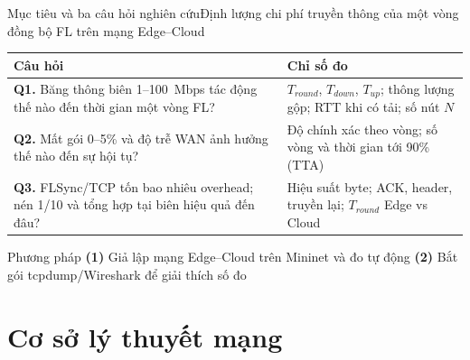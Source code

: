 \documentclass[aspectratio=169,10pt]{beamer}
\begin{document}
\begin{frame}{Mục tiêu và ba câu hỏi nghiên cứu}{Định lượng chi phí truyền thông của một vòng đồng bộ FL trên mạng Edge--Cloud}
  \small
  \begin{tabularx}{\textwidth}{>{\raggedright\arraybackslash\hsize=1.1\hsize}X >{\raggedright\arraybackslash\hsize=0.9\hsize}X}
    \toprule
    \textbf{Câu hỏi} & \textbf{Chỉ số đo} \\
    \midrule
    \textbf{Q1.} Băng thông biên 1--100~Mbps tác động thế nào đến thời gian một vòng FL? & $T_{round}$, $T_{down}$, $T_{up}$; thông lượng gộp; RTT khi có tải; số nút $N$ \\
    \midrule
    \textbf{Q2.} Mất gói 0--5\% và độ trễ WAN ảnh hưởng thế nào đến sự hội tụ? & Độ chính xác theo vòng; số vòng và thời gian tới 90\% (TTA) \\
    \midrule
    \textbf{Q3.} FLSync/TCP tốn bao nhiêu overhead; nén 1/10 và tổng hợp tại biên hiệu quả đến đâu? & Hiệu suất byte; ACK, header, truyền lại; $T_{round}$ Edge vs Cloud \\
    \bottomrule
  \end{tabularx}
  \vspace{8pt}

  \begin{block}{Phương pháp}
    \textbf{(1)} Giả lập mạng Edge--Cloud trên Mininet và đo tự động \quad
    \textbf{(2)} Bắt gói tcpdump/Wireshark để giải thích số đo
  \end{block}
\end{frame}

\section{Cơ sở lý thuyết mạng}
\end{document}
